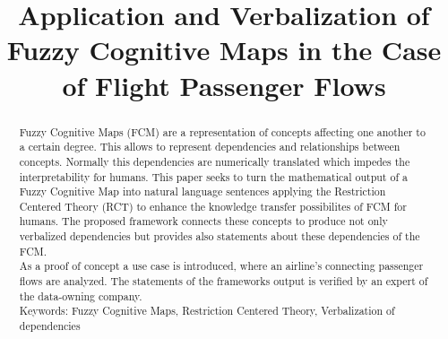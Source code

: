 \documentclass[conference]{IEEEtran}
\begin{document}
\title{Application and Verbalization of Fuzzy Cognitive Maps in the Case of Flight Passenger Flows}

\author{
\and
{}
\and
{}
}

\maketitle

\begin{abstract}
Fuzzy Cognitive Maps (FCM) are a representation of concepts affecting one another to a certain degree. This allows to represent dependencies and relationships between concepts. Normally this dependencies are numerically translated which impedes the interpretability for humans. This paper seeks to turn the mathematical output of a Fuzzy Cognitive Map into natural language sentences applying the Restriction Centered Theory (RCT) to enhance the knowledge transfer possibilites of FCM for humans. The proposed framework connects these concepts to produce not only verbalized dependencies but provides also statements about these dependencies of the FCM. \\
As a proof of concept a use case is introduced, where an airline's connecting passenger flows are analyzed. The statements of the frameworks output is verified by an expert of the data-owning company.\\
Keywords: Fuzzy Cognitive Maps, Restriction Centered Theory, Verbalization of dependencies
\end{abstract}

	
\IEEEpeerreviewmaketitle
\end{document}
